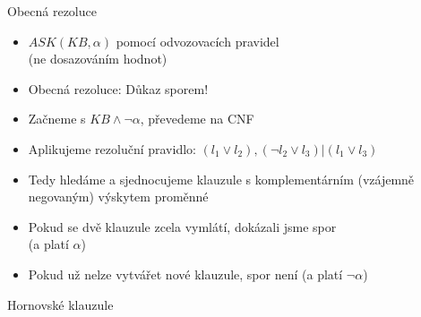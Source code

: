 \documentclass{beamer}
\begin{document}
\begin{frame}{Obecná rezoluce}
\begin{itemize}
\item $ASK(KB, \alpha)$ pomocí odvozovacích pravidel \\ (ne dosazováním hodnot)
\item Obecná rezoluce: Důkaz sporem!
\item Začneme s $KB \land \lnot \alpha$, převedeme na CNF
\item Aplikujeme rezoluční pravidlo: $ (l_1 \lor l_2), (\lnot l_2 \lor l_3) | (l_1 \lor l_3) $
\item Tedy hledáme a sjednocujeme klauzule s komplementárním (vzájemně negovaným) výskytem proměnné
\item Pokud se dvě klauzule zcela vymlátí, dokázali jsme spor \\ (a platí $\alpha$)
\item Pokud už nelze vytvářet nové klauzule, spor není (a platí $\lnot \alpha$)
\end{itemize}
\end{frame}

\begin{frame}{Hornovské klauzule}
\end{frame}
\end{document}
